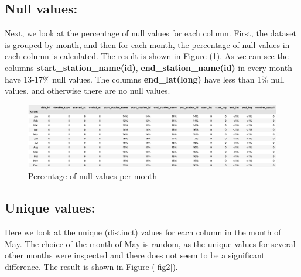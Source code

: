 \documentclass[12pt]{article}
\begin{document}
\subsection{Null values:}
Next, we look at the percentage of null values for each column. First, the dataset is grouped by month, and then for each month, the percentage of null values in each column is calculated. The result is shown in Figure (\underline{\ref{fig4}}). As we can see the columns \textbf{start\_station\_name(id)}, \textbf{end\_station\_name(id)} in every month have 13-17\% null values. The columns \textbf{end\_lat(long)} have less than 1\% null values, and otherwise there are no null values. \\
	
	\begin{figure}[h]
	\centering
	\includegraphics[scale=0.43]{null_percents.png}
	\caption{Percentage of null values per month}
	\label{fig4}
	\end{figure}
	
\subsection{Unique values:}
Here we look at the unique (distinct) values for each column in the month of May. The choice of the month of May is random, as the unique values for several other months were inspected and there does not seem to be a significant difference. The result is shown in Figure (\underline{\ref{fig2}}). 
	
\end{document}

